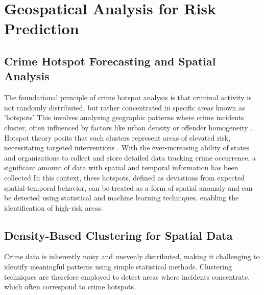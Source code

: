 \documentclass[12pt,a4paper,oneside,english]{book}
\begin{document}
{\section{Geospatical Analysis for Risk Prediction}
\label{sec:geospatial_theory}



\subsection{Crime Hotspot Forecasting and Spatial Analysis}



The foundational principle of crime hotspot analysis is that criminal activity is not randomly 
distributed, but rather concentrated in specific areas known as 'hotspots'
This involves analyzing geographic patterns where crime incidents cluster,
often influenced by factors like urban density or offender homogeneity \cite{chen2019exploring}. 
Hotspot theory posits that such clusters represent areas of elevated risk, necessitating targeted interventions  \cite{zhuang2017crime} .
With the ever-increasing ability of states and organizations to collect and store detailed data tracking crime occurrence, a significant amount of data with spatial and temporal information has been collected
In this context, these hotspots, defined as deviations from expected spatial-temporal behavior, can be treated as a form of spatial anomaly and can be detected using statistical and machine learning techniques, enabling the identification of high-risk areas.

\subsection{Density-Based Clustering for Spatial Data}%
\label{sec:dbscan_theory}
Crime data is inherently noisy and unevenly distributed, making it challenging to identify meaningful patterns using simple statistical methods. Clustering techniques are therefore employed to detect areas 
where incidents concentrate, which often correspond to crime hotspots.

}
\end{document}
